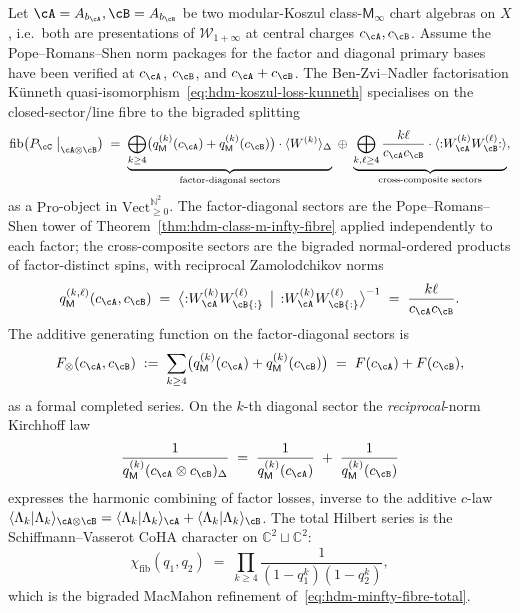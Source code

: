 \begin{theorem}
Let $\cA = A_{b_\cA}, \cB = A_{b_\cB}$ be two modular-Koszul
class-$\mathsf M_\infty$ chart algebras on $X$, i.e.\ both are
presentations of
$\mathcal W_{1+\infty}$ at central charges $c_\cA,c_\cB$. Assume the
Pope--Romans--Shen norm packages for the factor and diagonal primary
bases have been verified at $c_\cA$, $c_\cB$, and $c_\cA+c_\cB$. The
Ben-Zvi--Nadler factorisation K\"unneth
quasi-isomorphism~\eqref{eq:hdm-koszul-loss-kunneth} specialises on
the closed-sector/line fibre to the bigraded splitting
\begin{equation}\label{eq:hdm-m-infty-tensor-fibre}
\mathrm{fib}\bigl(P_\cC\bigm|_{\cA\otimes\cB}\bigr)
\;=\;
\underbrace{\bigoplus_{k\geq 4}
\bigl(q_\mathsf M^{(k)}(c_\cA)+q_\mathsf M^{(k)}(c_\cB)\bigr)\cdot
\langle W^{(k)}\rangle_{\Delta}}_{\text{factor-diagonal sectors}}
\;\oplus\;
\underbrace{\bigoplus_{k,\ell\geq 4}
\frac{k\ell}{c_\cA c_\cB}\cdot\langle{:}W_\cA^{(k)}W_\cB^{(\ell)}{:}\rangle
}_{\text{cross-composite sectors}},
\end{equation}
as a $\mathrm{Pro}$-object in $\mathrm{Vect}_{\geq 0}^{\mathbb N^{2}}$.
The factor-diagonal sectors are the Pope--Romans--Shen tower of
Theorem~\ref{thm:hdm-class-m-infty-fibre} applied independently to
each factor; the cross-composite sectors are the bigraded
normal-ordered products of factor-distinct spins, with reciprocal
Zamolodchikov norms
\[
q_\mathsf M^{(k,\ell)}(c_\cA,c_\cB)
\;=\;
\bigl\langle{:}W^{(k)}_\cA W^{(\ell)}_\cB{:}\,\bigm|\,
{:}W^{(k)}_\cA W^{(\ell)}_\cB{:}\bigr\rangle^{-1}
\;=\;
\frac{k\ell}{c_\cA c_\cB}.
\]
The additive generating function on the factor-diagonal sectors is
\begin{equation}\label{eq:hdm-m-infty-tensor-F}
F_\otimes(c_\cA,c_\cB)
\;:=\;\sum_{k\geq 4}
\bigl(q_\mathsf M^{(k)}(c_\cA)+q_\mathsf M^{(k)}(c_\cB)\bigr)
\;=\;F(c_\cA)+F(c_\cB),
\end{equation}
as a formal completed series. On the $k$-th diagonal sector the
\emph{reciprocal}-norm Kirchhoff law
\begin{equation}\label{eq:hdm-m-infty-tensor-kirchhoff}
\frac{1}{q_\mathsf M^{(k)}(c_\cA\otimes c_\cB)_{\Delta}}
\;=\;\frac{1}{q_\mathsf M^{(k)}(c_\cA)}
\;+\;\frac{1}{q_\mathsf M^{(k)}(c_\cB)}
\end{equation}
expresses the harmonic combining of factor losses, inverse to the
additive $c$-law
$\langle\Lambda_k|\Lambda_k\rangle_{\cA\otimes\cB}
=\langle\Lambda_k|\Lambda_k\rangle_\cA
+\langle\Lambda_k|\Lambda_k\rangle_\cB$. The total Hilbert series
is the Schiffmann--Vasserot CoHA character on $\mathbb C^2\sqcup\mathbb
C^2$:
\begin{equation}\label{eq:hdm-m-infty-tensor-hilbert}
\chi_{\mathrm{fib}}(q_1,q_2)
\;=\;\prod_{k\geq 4}\frac{1}{(1-q_1^k)(1-q_2^k)},
\end{equation}
which is the bigraded MacMahon refinement
of~\eqref{eq:hdm-minfty-fibre-total}.
\end{theorem}

